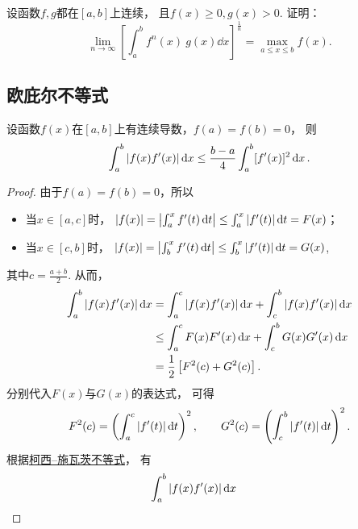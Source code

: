 \begin{example}
设函数\(f,g\)都在\([a,b]\)上连续，
且\(f(x)\geq0,
g(x)>0\).
证明：\begin{equation*}
	\lim_{n\to\infty} \left[ \int_a^b f^n(x)~g(x) \dd{x} \right]^{\frac1n}
	= \max_{a \leq x \leq b} f(x).
\end{equation*}
\end{example}

\subsection{欧庇尔不等式}
\begin{theorem}[欧庇尔不等式]\label{theorem:定积分.欧庇尔不等式}
设函数\(f(x)\)在\([a,b]\)上有连续导数，\(f(a)=f(b)=0\)，
则\begin{equation}\label{equation:定积分.欧庇尔不等式}
	\int_a^b \abs{f(x) f'(x)} \dd{x}
	\leq \frac{b-a}{4}
	\int_a^b [f'(x)]^2 \dd{x}.
\end{equation}
\begin{proof}
由于\(f(a)=f(b)=0\)，所以\begin{itemize}
	\item 当\(x \in \left[a,c\right]\)时，
	\(\abs{f(x)} = \abs{\int_a^x f'(t) \dd{t}} \leq \int_a^x \abs{f'(t)} \dd{t} = F(x)\)；
	\item 当\(x \in \left[c,b\right]\)时，
	\(\abs{f(x)} = \abs{\int_b^x f'(t) \dd{t}} \leq \int_b^x \abs{f'(t)} \dd{t} = G(x)\),
\end{itemize}
其中\(c=\frac{a+b}{2}\).
从而，\begin{align*}
	\int_a^b \abs{f(x) f'(x)} \dd{x}
	&= \int_a^c \abs{f(x) f'(x)} \dd{x}
		+ \int_c^b \abs{f(x) f'(x)} \dd{x} \\
	&\leq \int_a^c F(x) F'(x) \dd{x}
		+ \int_c^b G(x) G'(x) \dd{x} \\
	&= \frac{1}{2} \left[ F^2(c) + G^2(c) \right].
\end{align*}
分别代入\(F(x)\)与\(G(x)\)的表达式，
可得\begin{equation*}
	F^2(c) = \left( \int_a^c \abs{f'(t)} \dd{t} \right)^2,
	\qquad
	G^2(c) = \left( \int_c^b \abs{f'(t)} \dd{t} \right)^2.
\end{equation*}
根据\hyperref[equation:定积分.柯西--施瓦茨不等式]{柯西--施瓦茨不等式}，
有\begin{align*}
	&\hspace{-20pt}\int_a^b{\abs{f(x) f'(x)} \dd{x}}

\end{align*}
\end{proof}
\end{theorem}
